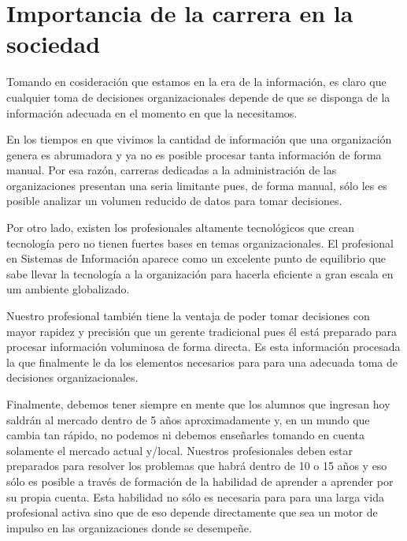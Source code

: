 \section{Importancia de la carrera en la sociedad}\label{sec:importance-in-the-society}
Tomando en cosideración que estamos en la era de la información, es claro que cualquier 
toma de decisiones organizacionales depende de que se disponga 
de la información adecuada en el momento en que la necesitamos.

En los tiempos en que vivimos la cantidad de información que una organización genera 
es abrumadora y ya no es posible procesar tanta información de forma manual. 
Por esa razón, carreras dedicadas a la administración de las organizaciones 
presentan una seria limitante pues, de forma manual, sólo les es posible analizar 
un volumen reducido de datos para tomar decisiones. 

Por otro lado, existen los profesionales altamente tecnológicos que crean tecnologí­a 
pero no tienen fuertes bases en temas organizacionales. El profesional en 
Sistemas de Información aparece como un excelente punto de equilibrio que sabe llevar la 
tecnologí­a a la organización para hacerla eficiente a gran escala en um ambiente globalizado.

Nuestro profesional también tiene la ventaja de poder tomar decisiones con mayor rapidez y precisión 
que un gerente tradicional pues él está preparado para procesar información voluminosa de forma directa. 
Es esta información procesada la que finalmente le da los elementos necesarios para
para una adecuada toma de decisiones organizacionales.

Finalmente, debemos tener siempre en mente que los alumnos que ingresan hoy 
saldrán al mercado dentro de 5 años aproximadamente y, en un mundo que cambia tan rápido, 
no podemos ni debemos enseñarles tomando en cuenta solamente el mercado actual y/local. 
Nuestros profesionales deben estar preparados para resolver los problemas 
que habrá dentro de 10 o 15 años y eso sólo es posible a través de formación de la habilidad 
de aprender a aprender por su propia cuenta. Esta habilidad no sólo es necesaria para para una larga 
vida profesional activa sino que de eso depende directamente que sea un motor de impulso en las 
organizaciones donde se desempeñe.
